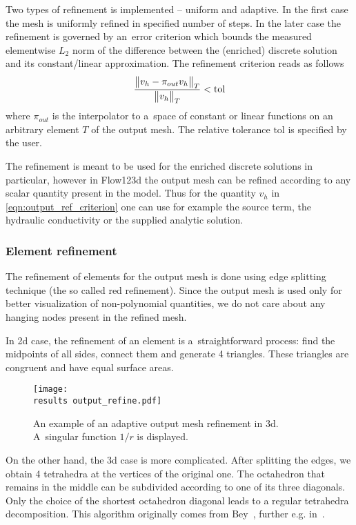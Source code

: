 Two types of refinement is implemented -- uniform and adaptive. In the first case the mesh is uniformly refined in
specified number of steps. In the later case the refinement is governed by an~error criterion which bounds 
the measured elementwise $L_2$ norm of the difference between the (enriched) discrete solution and its constant/linear approximation.
The refinement criterion reads as follows
\begin{equation} \label{eqn:output_ref_criterion}
    \frac{\bigl\Vert v_h - \pi_{out}v_h\bigr\Vert_{T}}{\bigl\Vert v_h\bigr\Vert_{T}} < \textrm{tol}
\end{equation}
where $\pi_{out}$ is the interpolator to a~space of constant or linear functions on an arbitrary element $T$ of the output mesh.
The relative tolerance $\textrm{tol}$ is specified by the user.

The refinement is meant to be used for the enriched discrete solutions in particular, however in Flow123d the output mesh can be refined
according to any scalar quantity present in the model. Thus for the quantity $v_h$ in \eqref{eqn:output_ref_criterion} one can use
for example the source term, the hydraulic conductivity or the supplied analytic solution.

\subsubsection{Element refinement}
\label{sec:element_refinement}
The refinement of elements for the output mesh is done using edge splitting technique (the so called red refinement).
Since the output mesh is used only for better visualization of non-polynomial quantities, we do not
care about any hanging nodes present in the refined mesh.

In 2d case, the refinement of an element is a~straightforward process: find the midpoints of all sides, connect them and generate 4 triangles.
These triangles are congruent and have equal surface areas.
%
\begin{figure}[!htb]
    \centering    
    \texttt{[image: \\results output\_refine.pdf]} 
    \caption[Output mesh refinement.]
  {An example of an adaptive output mesh refinement in 3d.
  A~singular function $1/r$ is displayed.}
  \label{fig:output_refinement_flow123d}
\end{figure}
%
On the other hand, the 3d case is more complicated. After splitting the edges, we obtain 4 tetrahedra at the vertices
of the original one. The octahedron that remains in the middle can be subdivided according to one of its three diagonals.
Only the choice of the shortest octahedron diagonal leads to a regular tetrahedra decomposition.
This algorithm originally comes from Bey~\cite{bey_2000}, further e.g. in~\cite{brandts_2011}.


